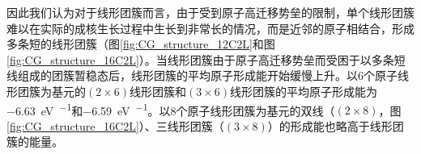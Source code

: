     因此我们认为对于线形团簇而言，由于受到原子高迁移势垒的限制，单个线形团簇难以在实际的成核生长过程中生长到非常长的情况，而是近邻的原子相结合，形成多条短的线形团簇（图\ref{fig:CG_structure_12C2L}和图\ref{fig:CG_structure_16C2L}）。当线形团簇由于原子高迁移势垒而受困于以多条短线组成的团簇暂稳态后，线形团簇的平均原子形成能开始缓慢上升。以6个原子线形团簇为基元的$\left(2 \times 6\right)$线形团簇和$\left(3 \times 6\right)$线形团簇的平均原子形成能为\SI{-6.63}{\electronvolt\per\atom}和\SI{-6.59}{\electronvolt\per\atom}。以8个原子线形团簇为基元的双线（$\left(2 \times 8\right)$，图\ref{fig:CG_structure_16C2L}）、三线形团簇（$\left(3 \times 8\right)$）的形成能也略高于线形团簇的能量。

